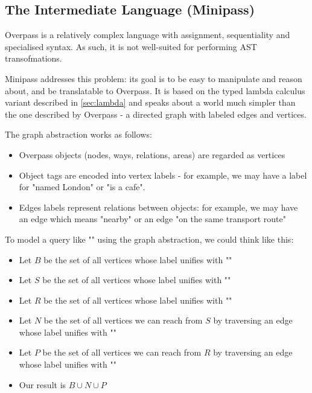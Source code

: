 \documentclass[main.tex]{subfiles}
\begin{document}
\subsection{The Intermediate Language (Minipass)}
\label{sec:minipass}
Overpass is a relatively complex language with assignment, sequentiality
and specialised syntax. As such, it is not well-suited for performing
AST transofmations.

Minipass addresses this problem: its goal is to be easy to manipulate
and reason about, and be translatable to Overpass. It is based on the typed
lambda calculus variant described in \cref{sec:lambda} and speaks about a
world much simpler than the one described by Overpass - a directed graph
with labeled edges and vertices.

The graph abstraction works as follows:
\begin{itemize}
    \item Overpass objects (nodes, ways, relations, areas) are regarded as
        vertices
    \item Object tags are encoded into vertex labels - for example, we
        may have a label for "named London" or "is a cafe".
    \item Edges labels represent relations between objects: for example,
        we may have an edge which means "nearby" or an edge "on the same
        transport route"
\end{itemize}

\begin{example}
    To model a query like ""
    using the graph abstraction, we could think like this:
    \begin{itemize}
        \item Let $B$ be the set of all vertices whose label unifies with
            ""
        \item Let $S$ be the set of all vertices whose label unifies with
            ""
        \item Let $R$ be the set of all vertices whose label unifies with
            ""
        \item Let $N$ be the set of all vertices we can reach from $S$
            by traversing an edge whose label unifies with ""
        \item Let $P$ be the set of all vertices we can reach from $R$
            by traversing an edge whose label unifies with ""
        \item Our result is $B \cup N \cup P$
    \end{itemize}
\end{example}
\end{document}
